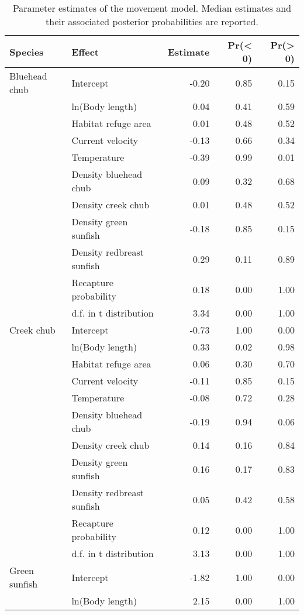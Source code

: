 \begin{table}[ht]
\centering
\caption{Parameter estimates of the movement model. Median estimates and their associated posterior probabilities are reported.} 
\label{tab:coefficients}
\begin{tabular}{llrrr}
  \hline
Species & Effect & Estimate & Pr(< 0) & Pr(> 0) \\ 
  \hline
Bluehead chub & Intercept & -0.20 & 0.85 & 0.15 \\ 
   & ln(Body length) & 0.04 & 0.41 & 0.59 \\ 
   & Habitat refuge area & 0.01 & 0.48 & 0.52 \\ 
   & Current velocity & -0.13 & 0.66 & 0.34 \\ 
   & Temperature & -0.39 & 0.99 & 0.01 \\ 
   & Density bluehead chub & 0.09 & 0.32 & 0.68 \\ 
   & Density creek chub & 0.01 & 0.48 & 0.52 \\ 
   & Density green sunfish & -0.18 & 0.85 & 0.15 \\ 
   & Density redbreast sunfish & 0.29 & 0.11 & 0.89 \\ 
   & Recapture probability & 0.18 & 0.00 & 1.00 \\ 
   & d.f. in t distribution & 3.34 & 0.00 & 1.00 \\ 
  Creek chub & Intercept & -0.73 & 1.00 & 0.00 \\ 
   & ln(Body length) & 0.33 & 0.02 & 0.98 \\ 
   & Habitat refuge area & 0.06 & 0.30 & 0.70 \\ 
   & Current velocity & -0.11 & 0.85 & 0.15 \\ 
   & Temperature & -0.08 & 0.72 & 0.28 \\ 
   & Density bluehead chub & -0.19 & 0.94 & 0.06 \\ 
   & Density creek chub & 0.14 & 0.16 & 0.84 \\ 
   & Density green sunfish & 0.16 & 0.17 & 0.83 \\ 
   & Density redbreast sunfish & 0.05 & 0.42 & 0.58 \\ 
   & Recapture probability & 0.12 & 0.00 & 1.00 \\ 
   & d.f. in t distribution & 3.13 & 0.00 & 1.00 \\ 
  Green sunfish & Intercept & -1.82 & 1.00 & 0.00 \\ 
   & ln(Body length) & 2.15 & 0.00 & 1.00 \\ 

\end{tabular}
\end{table}
